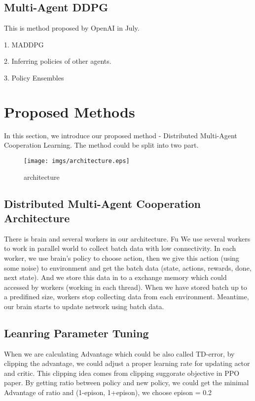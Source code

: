 \documentclass[11pt,twocolumn]{jarticle} %
\begin{document}
\subsection{Multi-Agent DDPG}
This is method proposed by OpenAI in July. \par
1. MADDPG \par
2. Inferring policies of other agents. \par
3. Policy Ensembles
\section{Proposed Methods}
In this section, we introduce our proposed method - Distributed Multi-Agent Cooperation Learning. The method could be split into two part. 

\begin{figure*}[t]
 \begin{center}
  \texttt{[image: imgs/architecture.eps]}
  \caption{architecture}
  \label{fig:architecture}
 \end{center}
\end{figure*}

\subsection{Distributed Multi-Agent Cooperation Architecture}
There is brain and several workers in our architecture. Fu We use several workers to work in parallel world to collect batch data with low connectivity. In each worker,  we use brain's policy to choose action, then we give this action (using some noise) to environment and get the batch data (state, actions, rewards, done, next state). And we store this data in to a exchange memory which could accessed by workers (working in each thread). When we have stored batch up to a predifined size, workers stop collecting data from each environment. Meantime, our brain starts to update network using batch data.
\subsection{Leanring Parameter Tuning}
When we are calculating Advantage which could be also called TD-error, by clipping the advantage, we could adjust a proper learning rate for updating actor and critic. This clipping idea comes from clipping suggorate objective in PPO paper. By getting ratio between policy and new policy, we could get the minimal Advantage of ratio and (1-epison, 1+epison), we choose epison = 0.2
\end{document}
